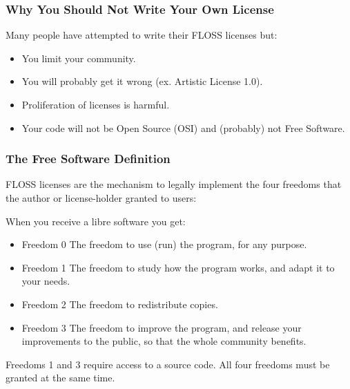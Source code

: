 \begin{frame}
\frametitle{Why You Should Not Write Your Own License}

Many people have attempted to write their FLOSS licenses but:

\begin{itemize}
\item You limit your community. 
\item You will probably get it wrong (ex. Artistic License 1.0).
\item Proliferation of licenses is harmful. 
\item Your code will not be Open Source (OSI) and (probably) not Free Software.
\end{itemize}

\end{frame}




\begin{frame}
\frametitle{The Free Software Definition}
FLOSS licenses are the mechanism to legally implement the four freedoms that the author or license-holder granted to users:

\bigskip

When you receive a libre software you get:
\begin{itemize}
\item {\alert{Freedom 0} The freedom to use (run) the program, for any purpose.}
\item {\alert{Freedom 1} The freedom to study how the program works, and adapt it to your needs. }
\item {\alert{Freedom 2} The freedom to redistribute copies.}
\item {\alert{Freedom 3} The freedom to improve the program, and release your improvements to the public, so that the whole community benefits. }
\end{itemize}

\pause

Freedoms 1 and 3 require access to a source code. All four freedoms must be granted \alert{at the same time}. 


\end{frame}


